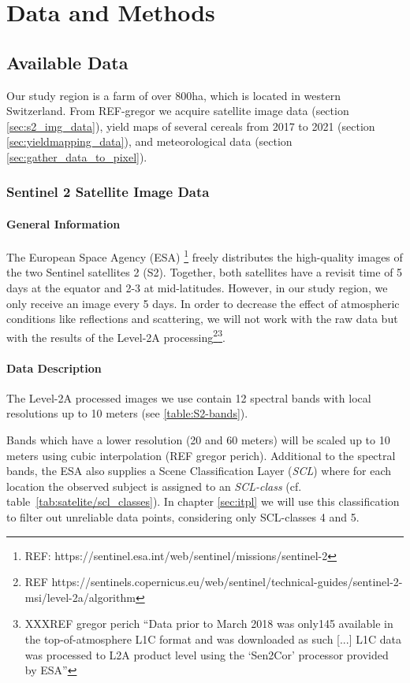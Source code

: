 \chapter{Data and Methods}

\section{Available Data}
	{
		Our study region is a farm of over 800ha, which is located in western Switzerland. From REF-gregor we acquire satellite image data (section \ref{sec:s2_img_data}), yield maps of several cereals from 2017 to 2021 (section \ref{sec:yieldmapping_data}), and meteorological data (section \ref{sec:gather_data_to_pixel}).
	}

	\subsection{Sentinel 2 Satellite Image Data}{
		\label{sec:s2_img_data}
		\subsubsection*{General Information}{
			The European Space Agency (ESA) \footnote{REF: https://sentinel.esa.int/web/sentinel/missions/sentinel-2} freely distributes the high-quality images of the two Sentinel satellites 2 (S2). Together, both satellites have a revisit time of 5 days at the equator and 2-3 at mid-latitudes. However, in our study region, we only receive an image every 5 days.
			In order to decrease the effect of atmospheric conditions like reflections and scattering, we will not work with the raw data but with the results of the Level-2A processing\footnote{REF https://sentinels.copernicus.eu/web/sentinel/technical-guides/sentinel-2-msi/level-2a/algorithm}\footnote{XXXREF gregor perich ``Data prior to March 2018 was only145
			available in the top-of-atmosphere L1C format and was downloaded as such [...] L1C data was processed to L2A product level using the `Sen2Cor' processor provided by ESA''}. 
		}

		\subsubsection*{Data Description}{
			The Level-2A processed images we use contain 12 spectral bands with local resolutions up to 10 meters (see \ref{table:S2-bands}).   
			
			Bands which have a lower resolution (20 and 60 meters) will be scaled up to 10 meters using cubic interpolation (REF gregor perich).
			Additional to the spectral bands, the ESA also supplies a Scene Classification Layer (\textit{SCL}) where for each location the observed subject is assigned to an \textit{SCL-class} (cf. table~\ref{tab:satelite/scl_classes}). In chapter \ref{sec:itpl}  we will use this classification to filter out unreliable data points, considering only SCL-classes 4 and 5.  
			
}}
